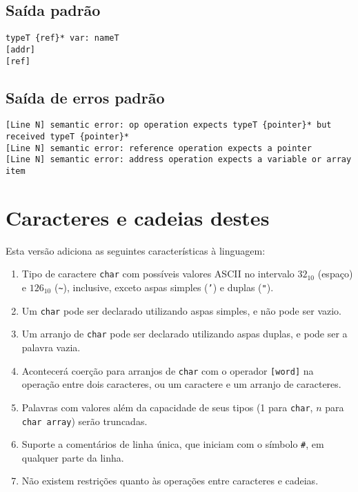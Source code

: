 \documentclass{article}
\newenvironment{smallenum}{
    \vspace{-1mm}
    \begin{enumerate}[label=\roman*.]
    \setlength{\parskip}{0pt}
    \setlength{\itemsep}{2pt}
}{
    \vspace{-2mm}
    \end{enumerate}
}
\begin{document}
\subsection{Saída padrão}

\begin{verbatim}
typeT {ref}* var: nameT
[addr]
[ref]
\end{verbatim}

\subsection{Saída de erros padrão}

\begin{verbatim}
[Line N] semantic error: op operation expects typeT {pointer}* but received typeT {pointer}*
[Line N] semantic error: reference operation expects a pointer
[Line N] semantic error: address operation expects a variable or array item
\end{verbatim}

\section{Caracteres e cadeias destes}

Esta versão adiciona as seguintes características à linguagem:

\begin{smallenum}

\item Tipo de caractere \texttt{char} com possíveis valores ASCII no intervalo
    $32_{10}$ (espaço) e $126_{10}$ (\texttt{\~}), inclusive, exceto aspas
    simples (\texttt{'}) e duplas (\texttt{"}).

\item Um \texttt{char} pode ser declarado utilizando aspas simples, e não
    pode ser vazio.

\item Um arranjo de \texttt{char} pode ser declarado utilizando aspas duplas,
    e pode ser a palavra vazia.

\item Acontecerá coerção para arranjos de \texttt{char} com o operador
    \texttt{[word]} na operação entre dois caracteres, ou um caractere e um
    arranjo de caracteres.

\item Palavras com valores além da capacidade de seus tipos (1 para
    \texttt{char}, $n$ para \texttt{char array}) serão truncadas.

\item Suporte a comentários de linha única, que iniciam com o símbolo
    \texttt{\#}, em qualquer parte da linha.

\item Não existem restrições quanto às operações entre caracteres e cadeias.

\end{smallenum}
\end{document}
